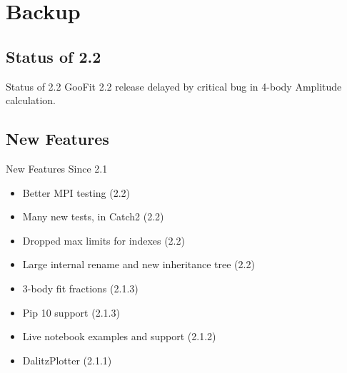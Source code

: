 \documentclass[aspectratio=169, smaller]{beamer}
\begin{document}
\section{Backup}

\subsection{Status of 2.2}
\begin{frame}{Status of 2.2}
    GooFit 2.2 release delayed by critical bug in 4-body Amplitude calculation.    
\end{frame}

\subsection{New Features}
\begin{frame}{New Features Since 2.1}
    \begin{itemize}
        \item Better MPI testing (2.2)
        \item Many new tests, in Catch2 (2.2)
        \item Dropped max limits for indexes (2.2)
        \item Large internal rename and new inheritance tree (2.2)
        \item 3-body fit fractions (2.1.3)
        \item Pip 10 support (2.1.3)
        \item Live notebook examples and support (2.1.2)
        \item DalitzPlotter (2.1.1)
    \end{itemize}
\end{frame}


\backupend
\end{document}
